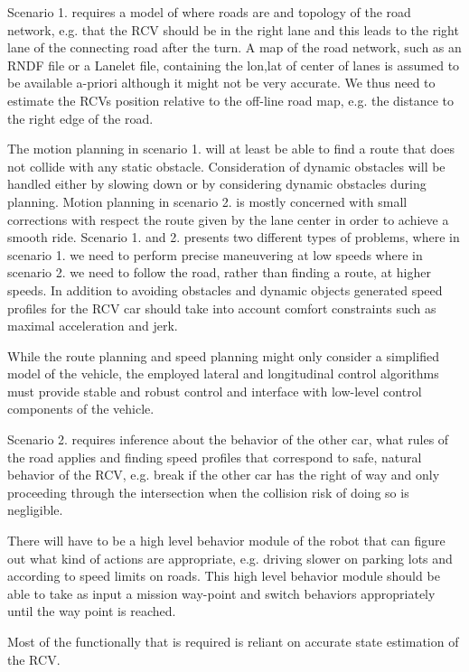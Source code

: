 \documentclass[11pt,a4paper]{article}
\begin{document}
Scenario 1. requires a model of where roads are and topology of the
road network, e.g. that the RCV should be in the right lane and this
leads to the right lane of the connecting road after the turn. A map
of the road network, such as an RNDF file or a Lanelet file, containing
the lon,lat of center of lanes is assumed to be available a-priori
although it might not be very accurate. We thus need to estimate the
RCVs position relative to the off-line road map, e.g. the distance to
the right edge of the road.

The motion planning in scenario 1. will at least be able to find a
route that does not collide with any static obstacle.  Consideration
of dynamic obstacles will be handled either by slowing down or by
considering dynamic obstacles during planning. Motion planning in
scenario 2.  is mostly concerned with small corrections with respect
the route given by the lane center in order to achieve a smooth
ride. Scenario 1. and 2. presents two different types of problems,
where in scenario 1. we need to perform precise maneuvering at low
speeds where in scenario 2. we need to follow the road, rather than
finding a route, at higher speeds. In addition to avoiding obstacles
and dynamic objects generated speed profiles for the RCV car should
take into account comfort constraints such as maximal acceleration and
jerk.

While the route planning and speed planning might only consider a
simplified model of the vehicle, the employed lateral and longitudinal
control algorithms must provide stable and robust control and interface
with low-level control components of the vehicle.

Scenario 2. requires inference about the behavior of the other car,
what rules of the road applies and finding speed profiles that
correspond to safe, natural behavior of the RCV, e.g. break if the
other car has the right of way and only proceeding through the
intersection when the collision risk of doing so is negligible.

There will have to be a high level behavior module of the robot that
can figure out what kind of actions are appropriate, e.g. driving
slower on parking lots and according to speed limits on roads. This
high level behavior module should be able to take as input a mission
way-point and switch behaviors appropriately until the way point is
reached.

Most of the functionally that is required is reliant on accurate
state estimation of the RCV.
\end{document}
